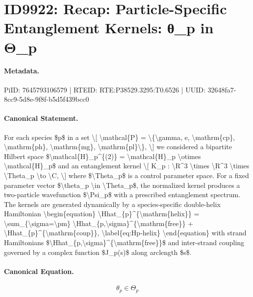 \section*{ID9922: Recap: Particle-Specific Entanglement Kernels: θ\_p in Θ\_p}
\paragraph{Metadata.}
PiID: 7645793106579 | RTEID: RTE:P38529.3295:T0.6526 | UUID: 32648fa7-8cc9-5d8e-9f8f-b5d5f439bcc0

\paragraph{Canonical Statement.}
For each species \$p\$ in a set \textbackslash{}[ \textbackslash{}mathcal\{P\} = \textbackslash{}\{\textbackslash{}gamma, e, \textbackslash{}mathrm\{cp\}, \textbackslash{}mathrm\{ph\}, \textbackslash{}mathrm\{mg\}, \textbackslash{}mathrm\{pl\}\textbackslash{}\}, \textbackslash{}] we considered a bipartite Hilbert space \$\textbackslash{}mathcal\{H\}\_p\textasciicircum{}\{(2)\} = \textbackslash{}mathcal\{H\}\_p \textbackslash{}otimes \textbackslash{}mathcal\{H\}\_p\$ and an entanglement kernel \textbackslash{}[ K\_p : \textbackslash{}R\textasciicircum{}3 \textbackslash{}times \textbackslash{}R\textasciicircum{}3 \textbackslash{}times \textbackslash{}Theta\_p \textbackslash{}to \textbackslash{}C, \textbackslash{}] where \$\textbackslash{}Theta\_p\$ is a control parameter space. For a fixed parameter vector \$\textbackslash{}theta\_p \textbackslash{}in \textbackslash{}Theta\_p\$, the normalized kernel produces a two-particle wavefunction \$\textbackslash{}Psi\_p\$ with a prescribed entanglement spectrum. The kernels are generated dynamically by a species-specific double-helix Hamiltonian \textbackslash{}begin\{equation\} \textbackslash{}Hhat\_\{p\}\textasciicircum{}\{\textbackslash{}mathrm\{helix\}\} = \textbackslash{}sum\_\{\textbackslash{}sigma=\textbackslash{}pm\} \textbackslash{}Hhat\_\{p,\textbackslash{}sigma\}\textasciicircum{}\{\textbackslash{}mathrm\{free\}\} + \textbackslash{}Hhat\_\{p\}\textasciicircum{}\{\textbackslash{}mathrm\{coup\}\}, \textbackslash{}label\{eq:Hp-helix\} \textbackslash{}end\{equation\} with strand Hamiltonians \$\textbackslash{}Hhat\_\{p,\textbackslash{}sigma\}\textasciicircum{}\{\textbackslash{}mathrm\{free\}\}\$ and inter-strand coupling governed by a complex function \$J\_p(s)\$ along arclength \$s\$.

\paragraph{Canonical Equation.}
\[
\theta_p \in \Theta_p
\]


